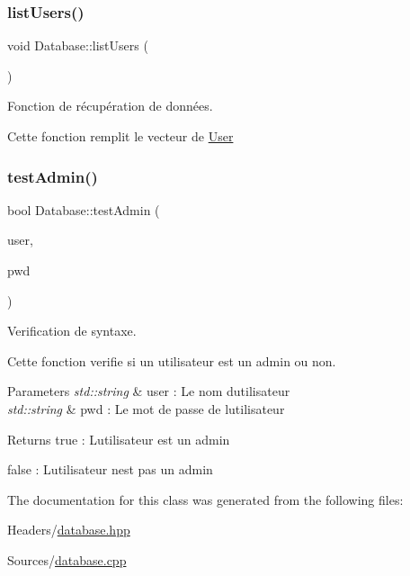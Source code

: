 \subsubsection{\texorpdfstring{list\+Users()}{listUsers()}}
{\footnotesize\ttfamily void Database\+::list\+Users (\begin{DoxyParamCaption}{ }\end{DoxyParamCaption})}



Fonction de récupération de données. 

Cette fonction remplit le vecteur de \mbox{\hyperlink{classUser}{User}} \mbox{\label{classDatabase_aab00e57287fe5e19c727c6cd2cadc154}} 
\subsubsection{\texorpdfstring{test\+Admin()}{testAdmin()}}
{\footnotesize\ttfamily bool Database\+::test\+Admin (\begin{DoxyParamCaption}\item[{string}]{user,  }\item[{string}]{pwd }\end{DoxyParamCaption})}



Verification de syntaxe. 

Cette fonction verifie si un utilisateur est un admin ou non.


\begin{DoxyParams}{Parameters}
{\em std\+::string} & user \+: Le nom d\textquotesingle{}utilisateur \\
\hline
{\em std\+::string} & pwd \+: Le mot de passe de l\textquotesingle{}utilisateur\\
\hline
\end{DoxyParams}
\begin{DoxyReturn}{Returns}
true \+: L\textquotesingle{}utilisateur est un admin 

false \+: L\textquotesingle{}utilisateur n\textquotesingle{}est pas un admin 
\end{DoxyReturn}


The documentation for this class was generated from the following files\+:\begin{DoxyCompactItemize}
\item 
Headers/\mbox{\hyperlink{database_8hpp}{database.\+hpp}}\item 
Sources/\mbox{\hyperlink{database_8cpp}{database.\+cpp}}\end{DoxyCompactItemize}

